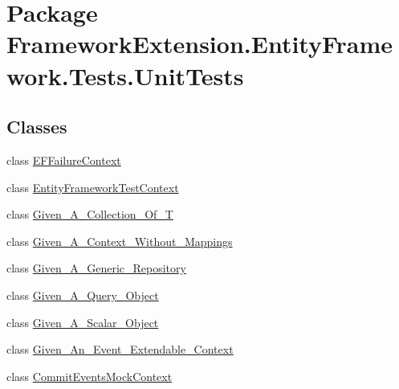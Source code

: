 \hypertarget{namespace_framework_extension_1_1_entity_framework_1_1_tests_1_1_unit_tests}{\section{Package Framework\-Extension.\-Entity\-Framework.\-Tests.\-Unit\-Tests}
\label{namespace_framework_extension_1_1_entity_framework_1_1_tests_1_1_unit_tests}
}
\subsection*{Classes}
\begin{DoxyCompactItemize}
\item 
class \hyperlink{class_framework_extension_1_1_entity_framework_1_1_tests_1_1_unit_tests_1_1_e_f_failure_context}{E\-F\-Failure\-Context}
\item 
class \hyperlink{class_framework_extension_1_1_entity_framework_1_1_tests_1_1_unit_tests_1_1_entity_framework_test_context}{Entity\-Framework\-Test\-Context}
\item 
class \hyperlink{class_framework_extension_1_1_entity_framework_1_1_tests_1_1_unit_tests_1_1_given___a___collection___of___t}{Given\-\_\-\-A\-\_\-\-Collection\-\_\-\-Of\-\_\-\-T}
\item 
class \hyperlink{class_framework_extension_1_1_entity_framework_1_1_tests_1_1_unit_tests_1_1_given___a___context___without___mappings}{Given\-\_\-\-A\-\_\-\-Context\-\_\-\-Without\-\_\-\-Mappings}
\item 
class \hyperlink{class_framework_extension_1_1_entity_framework_1_1_tests_1_1_unit_tests_1_1_given___a___generic___repository}{Given\-\_\-\-A\-\_\-\-Generic\-\_\-\-Repository}
\item 
class \hyperlink{class_framework_extension_1_1_entity_framework_1_1_tests_1_1_unit_tests_1_1_given___a___query___object}{Given\-\_\-\-A\-\_\-\-Query\-\_\-\-Object}
\item 
class \hyperlink{class_framework_extension_1_1_entity_framework_1_1_tests_1_1_unit_tests_1_1_given___a___scalar___object}{Given\-\_\-\-A\-\_\-\-Scalar\-\_\-\-Object}
\item 
class \hyperlink{class_framework_extension_1_1_entity_framework_1_1_tests_1_1_unit_tests_1_1_given___an___event___extendable___context}{Given\-\_\-\-An\-\_\-\-Event\-\_\-\-Extendable\-\_\-\-Context}
\item 
class \hyperlink{class_framework_extension_1_1_entity_framework_1_1_tests_1_1_unit_tests_1_1_commit_events_mock_context}{Commit\-Events\-Mock\-Context}
\end{DoxyCompactItemize}
